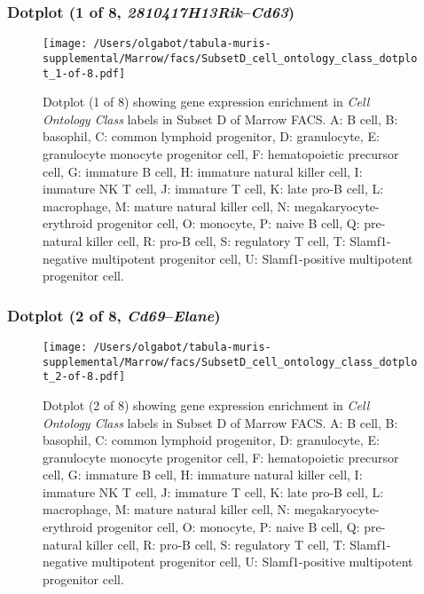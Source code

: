 \subsubsection{Dotplot (1 of 8, \emph{2810417H13Rik}--\emph{Cd63})}
\begin{figure}[h]
\centering
\texttt{[image: /Users/olgabot/tabula-muris-supplemental/Marrow/facs/SubsetD\_cell\_ontology\_class\_dotplot\_1-of-8.pdf]}

\caption{ Dotplot (1 of 8)  showing gene expression enrichment in \emph{Cell Ontology Class} labels in Subset D of Marrow FACS. A: B cell, B: basophil, C: common lymphoid progenitor, D: granulocyte, E: granulocyte monocyte progenitor cell, F: hematopoietic precursor cell, G: immature B cell, H: immature natural killer cell, I: immature NK T cell, J: immature T cell, K: late pro-B cell, L: macrophage, M: mature natural killer cell, N: megakaryocyte-erythroid progenitor cell, O: monocyte, P: naive B cell, Q: pre-natural killer cell, R: pro-B cell, S: regulatory T cell, T: Slamf1-negative multipotent progenitor cell, U: Slamf1-positive multipotent progenitor cell.}
\end{figure}


\clearpage

\subsubsection{Dotplot (2 of 8, \emph{Cd69}--\emph{Elane})}
\begin{figure}[h]
\centering
\texttt{[image: /Users/olgabot/tabula-muris-supplemental/Marrow/facs/SubsetD\_cell\_ontology\_class\_dotplot\_2-of-8.pdf]}

\caption{ Dotplot (2 of 8)  showing gene expression enrichment in \emph{Cell Ontology Class} labels in Subset D of Marrow FACS. A: B cell, B: basophil, C: common lymphoid progenitor, D: granulocyte, E: granulocyte monocyte progenitor cell, F: hematopoietic precursor cell, G: immature B cell, H: immature natural killer cell, I: immature NK T cell, J: immature T cell, K: late pro-B cell, L: macrophage, M: mature natural killer cell, N: megakaryocyte-erythroid progenitor cell, O: monocyte, P: naive B cell, Q: pre-natural killer cell, R: pro-B cell, S: regulatory T cell, T: Slamf1-negative multipotent progenitor cell, U: Slamf1-positive multipotent progenitor cell.}
\end{figure}


\clearpage

